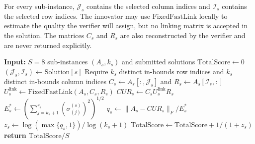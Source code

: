 \documentclass[12pt, legalpaper]{article}
\begin{document}
For every sub-instance, $\mathcal J_s$ contains the selected column indices
and $\mathcal I_s$ contains the selected row indices. The innovator may use
$\mathrm{FixedFastLink}$ locally to estimate the quality the verifier will
assign, but no linking matrix is accepted in the solution. The matrices $C_s$
and $R_s$ are also reconstructed by the verifier and are never returned
explicitly.

\begin{algorithm}
\caption{\textbf{Verification} that scores the submitted solutions.}
\label{sec:algorithm_verify}
\begin{algorithmic}[1]
\STATE \textbf{Input:} $S=8$ sub-instances $(A_s,k_s)$ and submitted
solutions
\STATE $\mathrm{TotalScore}\gets0$
    \STATE $(\mathcal J_s,\mathcal I_s)\gets\mathrm{Solution}[s]$
    \STATE Require $k_s$ distinct in-bounds row indices and $k_s$ distinct
    in-bounds column indices
    \STATE $C_s\gets A_s[:,\mathcal J_s]$ and
    $R_s\gets A_s[\mathcal I_s,:]$
    \STATE $U_s^{\mathrm{link}}\gets
    \mathrm{FixedFastLink}(A_s,C_s,R_s)$
    \STATE $CUR_s\gets C_sU_s^{\mathrm{link}}R_s$
    \STATE $E_s^*\gets
    \left(\sum_{j=k_s+1}^{r_s}(\sigma_{(j)}^{(s)})^2\right)^{1/2}$
    \STATE $q_s\gets\|A_s-CUR_s\|_F/E_s^*$
    \STATE $z_s\gets\log(\max\{q_s,1\})/\log(k_s+1)$
    \STATE $\mathrm{TotalScore}\gets
    \mathrm{TotalScore}+1/(1+z_s)$
\ENDFOR
\STATE \textbf{return} $\mathrm{TotalScore}/S$
\end{algorithmic}
\end{algorithm}

\end{document}

